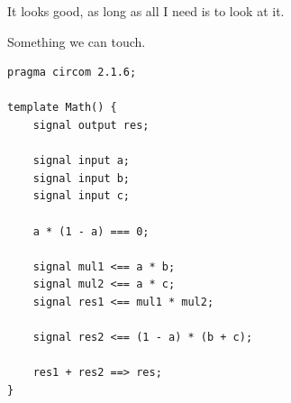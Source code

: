 \documentclass{zkdl-presentation-template}
\begin{document}
\begin{frame}{It looks good, as long as all I need is to look at it.}
\begin{center}
        \end{center}
    \end{frame}

    \begin{frame}[fragile]{Something we can touch.}
        \begin{lstlisting}[language=Circom,numbers=none,label={lst:lstlisting1}]
pragma circom 2.1.6;

template Math() {
    signal output res;

    signal input a;
    signal input b;
    signal input c;

    a * (1 - a) === 0;

    signal mul1 <== a * b;
    signal mul2 <== a * c;
    signal res1 <== mul1 * mul2;

    signal res2 <== (1 - a) * (b + c);

    res1 + res2 ==> res;
}
        \end{lstlisting}
    \end{frame}
\end{document}
